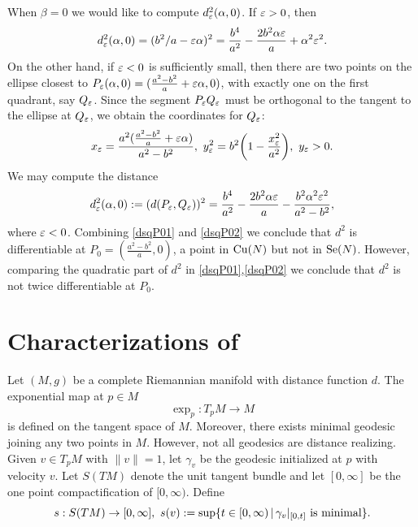 \begin{eg}
    \vspace{0.1cm}
    \hf When $\beta=0$ we would like to compute $d^2_\varepsilon(\alpha,0)$. If $\varepsilon>0$, then 
    \begin{equation}
        \label{dsqP01}d^2_\varepsilon(\alpha,0)=(b^2/a-\varepsilon\alpha)^2=\frac{b^4}{a^2}-\frac{2b^2\alpha\varepsilon}{a}+\alpha^2\varepsilon^2.
    \end{equation}
    On the other hand, if $\varepsilon<0$ is sufficiently small, then there are two points on the ellipse closest to $P_\varepsilon(\alpha,0)=(\frac{a^2-b^2}{a}+\varepsilon\alpha,0)$, with exactly one on the first quadrant, say $Q_\varepsilon$. Since the segment $P_\varepsilon Q_\varepsilon$ must be orthogonal to the tangent to the ellipse at $Q_\varepsilon$, we obtain the coordinates for $Q_\varepsilon$:
    \begin{displaymath}
        x_\varepsilon=\frac{a^2(\frac{a^2-b^2}{a}+\varepsilon\alpha)}{a^2-b^2},\,\,y^2_\varepsilon=b^2\bigg(1-\frac{x_\varepsilon^2}{a^2}\bigg),\,\,y_\varepsilon>0.
    \end{displaymath}
    We may compute the distance
    \begin{equation}
        \label{dsqP02}d^2_{\varepsilon}(\alpha,0):=(d(P_\varepsilon,Q_\varepsilon))^2=\frac{b^4}{a^2}-\frac{2b^2\alpha\varepsilon}{a}-\frac{b^2\alpha^2\varepsilon^2}{a^2-b^2},
    \end{equation}
    where $\varepsilon<0$. Combining \eqref{dsqP01} and \eqref{dsqP02} we conclude that $d^2$ is differentiable at $P_0=(\frac{a^2-b^2}{a},0)$, a point in $\mathrm{Cu}(N)$ but not in $\mathrm{Se}(N)$. However, comparing the quadratic part of $d^2$ in \eqref{dsqP01},\eqref{dsqP02} we conclude that $d^2$ is not twice differentiable at $P_0$. 
\end{eg}

\section{Characterizations of \texorpdfstring{\cutn}{Cu(N)}}\label{sec:characterizationOfCutLocus}
\hfb Let $(M,g)$ be a complete Riemannian manifold with distance function $d$. The exponential map  at $p\in M$
\begin{displaymath}
    \exp_p:T_p M \to M
\end{displaymath}
is defined on the tangent space of $M$. Moreover, there exists minimal geodesic joining any two points in $M$. However, not all geodesics are distance realizing. Given $v\in T_p M$ with $\|v\|=1$, let $\gamma_v$ be the geodesic initialized at $p$ with velocity $v$. Let $S(TM)$ denote the unit tangent bundle and let $ [0,\infty]$ be the one point compactification of $ [0,\infty)$. Define 
\begin{displaymath}
    s:S(TM)\to [0,\infty],\,\,s(v):=\sup\{t\in [0,\infty)\,|\,\gamma_v |_{[0,t]}\,\,\textup{is minimal}\}.
\end{displaymath}

